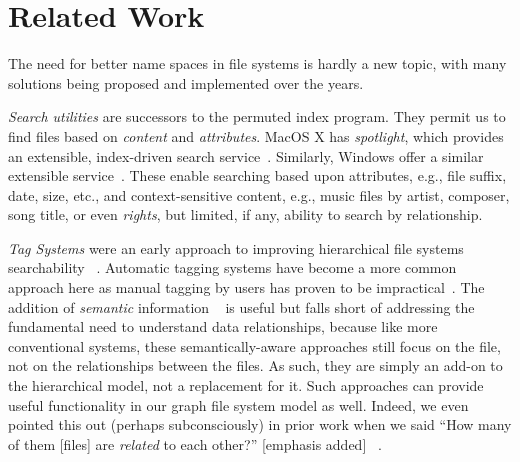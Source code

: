 \section{Related Work}\label{sec:background}

The need for better name spaces in file systems is hardly a new
topic, with many solutions being proposed and implemented over
the years.

\textit{Search utilities} are successors to the permuted index program.  They permit us to find
files based on \textit{content} and \textit{attributes}.  MacOS X has \textit{spotlight}, which
provides an extensible, index-driven search service~\cite{apple:spotlight-extensions}.  Similarly,
Windows offer a similar extensible service~\cite{microsoft:data-add-in}.  These enable searching
based upon attributes, e.g., file suffix, date, size, etc., and context-sensitive content, e.g.,
music files by artist, composer, song title, or even \textit{rights},
but limited, if any, ability to search by relationship.



\textit{Tag Systems} were an early approach to improving hierarchical file systems searchability%
~\cite{Parker-Wood2014,chou2015findfs,ma2009file,laursen2014,nayuki2017,Andrews2012,Up2016,Jones2016,aws:s3:object:tagging,ames2006lifs,leung2009magellan,frieder2012hierarchical}.
Automatic tagging systems have become a more common approach here as manual tagging by users 
has proven to be impractical~\cite{soules2003can,soules2004toward}.
The addition of \textit{semantic} information
~\cite{di2017gfs,hua2016real,martin2004formal,Martin2005,martin2008,martin2014,gifford1991semantic,Faubel2008,harlan2011joinfs,Suguna2015,Andrews2012,ngo2007integrating,Omvlee2009,wang2003managing,gopal1999integrating,Codocedo2015,Jones2016,Mahalingam2003,Parker-Wood2014}
is useful but falls short of addressing the fundamental need to understand
data relationships, because like more conventional systems,
these semantically-aware approaches still focus on the file,
not on the relationships between the files.
As such, they are simply an add-on to
the hierarchical model, not a replacement for it.
Such approaches can provide useful functionality
in our graph file system model as well.
Indeed, we even pointed this out (perhaps subconsciously) in prior
work when we said ``How many of them [files] are \textit{related} to
each other?'' [emphasis added]~\cite{Seltzer2009} .

